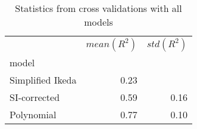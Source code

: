 
\begin{table}[H]
    \centering
    \caption{Statistics from cross validations with all models}
   \begin{tabular}{lrr}
\toprule
{} &  $mean(R^2)$ &  $std(R^2)$ \\
model            &              &             \\
\midrule
Simplified Ikeda &         0.23 &             \\
SI-corrected     &         0.59 &        0.16 \\
Polynomial       &         0.77 &        0.10 \\
\bottomrule
\end{tabular}

    \label{tab:crossvalidation}
\end{table}
    